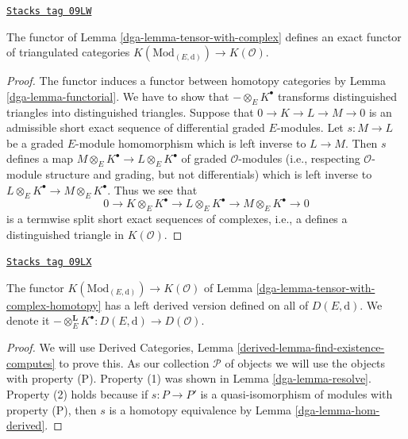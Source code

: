 \begin{lemma}
\label{dga-lemma-tensor-with-complex-homotopy}
\href{https://stacks.math.columbia.edu/tag/09LW}{\texttt{Stacks tag 09LW}}

The functor of Lemma \ref{dga-lemma-tensor-with-complex} defines an exact functor
of triangulated categories
$K(\text{Mod}_{(E, \text{d})}) \to K(\mathcal{O})$.
\end{lemma}

\begin{proof}

The functor induces a functor between homotopy categories by
Lemma \ref{dga-lemma-functorial}.
We have to show that $- \otimes_E K^\bullet$ transforms distinguished
triangles into distinguished triangles.
Suppose that $0 \to K \to L \to M \to 0$ is an admissible short
exact sequence of differential graded $E$-modules. Let $s : M \to L$ be
a graded $E$-module homomorphism which is left inverse to $L \to M$.
Then $s$ defines a map $M \otimes_E K^\bullet \to L \otimes_E K^\bullet$
of graded $\mathcal{O}$-modules (i.e., respecting $\mathcal{O}$-module
structure and grading, but not differentials)
which is left inverse to $L \otimes_E K^\bullet \to M \otimes_E K^\bullet$.
Thus we see that
$$
0 \to K \otimes_E K^\bullet \to L \otimes_E K^\bullet \to
M \otimes_E K^\bullet \to 0
$$
is a termwise split short exact sequences of complexes, i.e., a
defines a distinguished triangle in $K(\mathcal{O})$.
\end{proof}

\begin{lemma}
\label{dga-lemma-tensor-with-complex-derived}
\href{https://stacks.math.columbia.edu/tag/09LX}{\texttt{Stacks tag 09LX}}

The functor $K(\text{Mod}_{(E, \text{d})}) \to K(\mathcal{O})$
of Lemma \ref{dga-lemma-tensor-with-complex-homotopy} has a left derived
version defined on all of $D(E, \text{d})$. We denote it
$- \otimes_E^\mathbf{L} K^\bullet : D(E, \text{d}) \to D(\mathcal{O})$.
\end{lemma}

\begin{proof}

We will use
Derived Categories, Lemma \ref{derived-lemma-find-existence-computes}
to prove this. As our collection $\mathcal{P}$
of objects we will use the objects with property (P).
Property (1) was shown in Lemma \ref{dga-lemma-resolve}.
Property (2) holds because if $s : P \to P'$ is a quasi-isomorphism
of modules with property (P), then $s$ is a homotopy equivalence
by Lemma \ref{dga-lemma-hom-derived}.
\end{proof}

